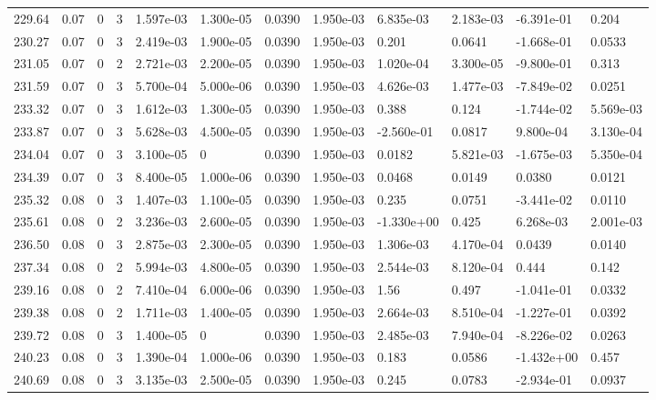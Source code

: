 \documentclass[preview]{standalone}
\begin{document}
{{{{{{{{\begin{tabular}{L{1.2cm}C{1.2cm} C{0.3cm}C{0.5cm} C{1.4cm}C{1.4cm} C{1.4cm}C{1.4cm} C{1.6cm}C{1.6cm} C{1.6cm}C{1.6cm}}
  229.64  &  0.07  & 0     &  3 &  1.597e-03  & 1.300e-05  &  0.0390&   1.950e-03& 6.835e-03 & 2.183e-03   &  -6.391e-01 & 0.204  \\ 
  230.27  &  0.07  & 0     &  3 &  2.419e-03  & 1.900e-05  &  0.0390&   1.950e-03& 0.201 & 0.0641   &  -1.668e-01 & 0.0533  \\ 
  231.05  &  0.07  & 0     &  2 &  2.721e-03  & 2.200e-05  &  0.0390&   1.950e-03& 1.020e-04 & 3.300e-05   &  -9.800e-01 & 0.313  \\ 
  231.59  &  0.07  & 0     &  3 &  5.700e-04  & 5.000e-06  &  0.0390&   1.950e-03& 4.626e-03 & 1.477e-03   &  -7.849e-02 & 0.0251  \\ 
  233.32  &  0.07  & 0     &  3 &  1.612e-03  & 1.300e-05  &  0.0390&   1.950e-03& 0.388 & 0.124   &  -1.744e-02 & 5.569e-03  \\ 
  233.87  &  0.07  & 0     &  3 &  5.628e-03  & 4.500e-05  &  0.0390&   1.950e-03& -2.560e-01 & 0.0817   &  9.800e-04 & 3.130e-04  \\ 
  234.04  &  0.07  & 0     &  3 &  3.100e-05  & 0  &  0.0390&   1.950e-03& 0.0182 & 5.821e-03   &  -1.675e-03 & 5.350e-04  \\ 
  234.39  &  0.07  & 0     &  3 &  8.400e-05  & 1.000e-06  &  0.0390&   1.950e-03& 0.0468 & 0.0149   &  0.0380 & 0.0121  \\ 
  235.32  &  0.08  & 0     &  3 &  1.407e-03  & 1.100e-05  &  0.0390&   1.950e-03& 0.235 & 0.0751   &  -3.441e-02 & 0.0110  \\ 
  235.61  &  0.08  & 0     &  2 &  3.236e-03  & 2.600e-05  &  0.0390&   1.950e-03& -1.330e+00 & 0.425   &  6.268e-03 & 2.001e-03  \\ 
  236.50  &  0.08  & 0     &  3 &  2.875e-03  & 2.300e-05  &  0.0390&   1.950e-03& 1.306e-03 & 4.170e-04   &  0.0439 & 0.0140  \\ 
  237.34  &  0.08  & 0     &  2 &  5.994e-03  & 4.800e-05  &  0.0390&   1.950e-03& 2.544e-03 & 8.120e-04   &  0.444 & 0.142  \\ 
  239.16  &  0.08  & 0     &  2 &  7.410e-04  & 6.000e-06  &  0.0390&   1.950e-03& 1.56 & 0.497   &  -1.041e-01 & 0.0332  \\ 
  239.38  &  0.08  & 0     &  2 &  1.711e-03  & 1.400e-05  &  0.0390&   1.950e-03& 2.664e-03 & 8.510e-04   &  -1.227e-01 & 0.0392  \\ 
  239.72  &  0.08  & 0     &  3 &  1.400e-05  & 0  &  0.0390&   1.950e-03& 2.485e-03 & 7.940e-04   &  -8.226e-02 & 0.0263  \\ 
  240.23  &  0.08  & 0     &  3 &  1.390e-04  & 1.000e-06  &  0.0390&   1.950e-03& 0.183 & 0.0586   &  -1.432e+00 & 0.457  \\ 
  240.69  &  0.08  & 0     &  3 &  3.135e-03  & 2.500e-05  &  0.0390&   1.950e-03& 0.245 & 0.0783   &  -2.934e-01 & 0.0937  \\ 
\hline 
\end{tabular} 

}}}}}}}}
\end{document}
